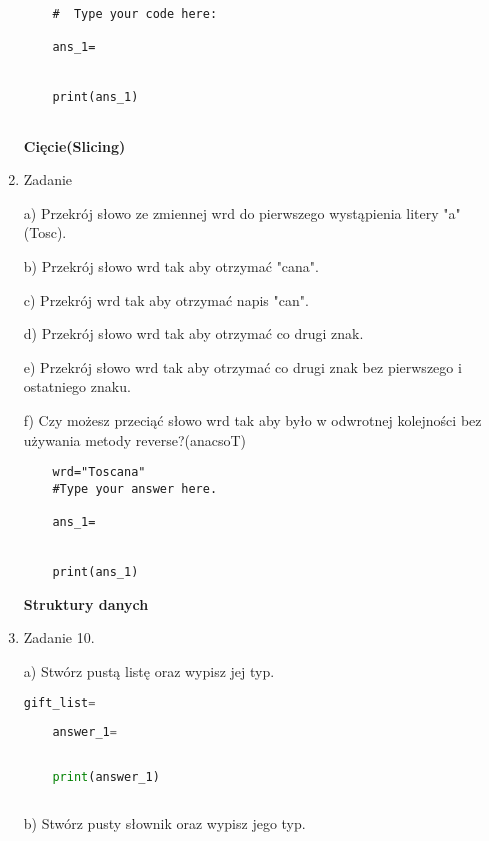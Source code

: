 \documentclass[11pt]{article}
\begin{document}
\begin{enumerate}
\begin{lstlisting}
	#  Type your code here:
	
	ans_1=
	
	
	print(ans_1)
	
\end{lstlisting}

\medskip
\begin{Large}
	\textbf{Cięcie(Slicing)}
\end{Large}

\item 
\begin{Large}
	Zadanie
\end{Large}
\par

a) Przekrój słowo ze zmiennej wrd do pierwszego wystąpienia litery "a" (Tosc).
\par
b) Przekrój słowo wrd tak aby otrzymać "cana".
\par
c) Przekrój wrd tak aby otrzymać napis "can".
\par
d) Przekrój słowo wrd tak aby otrzymać co drugi znak.
\par
e) Przekrój słowo wrd tak aby otrzymać co drugi znak bez pierwszego i ostatniego znaku.
\par
f) Czy możesz przeciąć słowo wrd tak aby było w odwrotnej kolejności bez używania metody reverse?(anacsoT)
\begin{lstlisting}
	wrd="Toscana"
	#Type your answer here.
	
	ans_1=
	
	
	print(ans_1)
\end{lstlisting}






\medskip
\begin{Large}
	\textbf{Struktury danych}
\end{Large}

	\item
	\begin{Large}
		Zadanie 10.
	\end{Large} 
	\par
	a) Stwórz pustą listę oraz wypisz jej typ.
	\begin{lstlisting}[language=Python]
	gift_list=
	
	answer_1=
	
	
	print(answer_1)
	
	\end{lstlisting}
\par
b) Stwórz pusty słownik oraz wypisz jego typ.


\end{enumerate}
\end{document}
